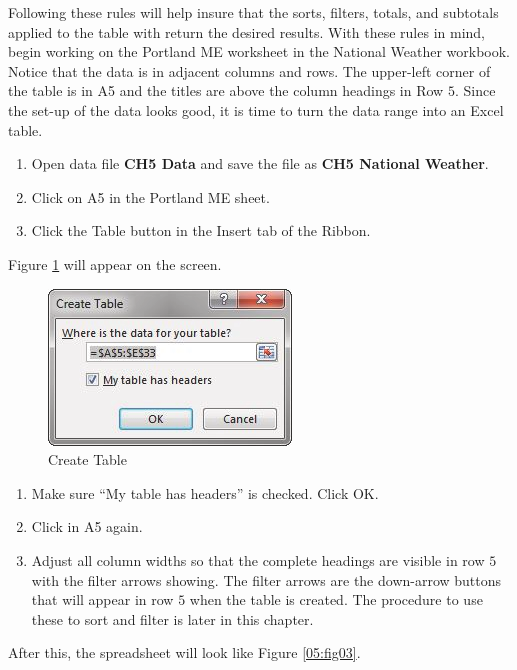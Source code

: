 Following these rules will help insure that the sorts, filters, totals, and subtotals applied to the table with return the desired results. With these rules in mind, begin working on the Portland ME worksheet in the National Weather workbook. Notice that the data is in adjacent columns and rows. The upper-left corner of the table is in \textsf{A5} and the titles are above the column headings in Row $ 5 $. Since the set-up of the data looks good, it is time to turn the data range into an Excel table.

\begin{enumerate}
	\item Open data file \textbf{CH5 Data} and save the file as \textbf{CH5 National Weather}.
	\item Click on \textsf{A5} in the Portland ME sheet.
	\item Click the Table button in the Insert tab of the Ribbon.
\end{enumerate}

Figure \ref{05:fig02} will appear on the screen.

\begin{figure}[H]
	\centering
	\includegraphics[width=\maxwidth{.95\linewidth}]{gfx/ch05_fig02}
	\caption{Create Table}
	\label{05:fig02}
\end{figure}

\begin{enumerate}
	\item Make sure ``My table has headers'' is checked. Click OK.
	\item Click in \textsf{A5} again.
	\item Adjust all column widths so that the complete headings are visible in row $ 5 $ with the filter arrows showing. The filter arrows are the down-arrow buttons that will appear in row $ 5 $ when the table is created. The procedure to use these to sort and filter is later in this chapter.
\end{enumerate}

After this, the spreadsheet will look like Figure \ref{05:fig03}.

